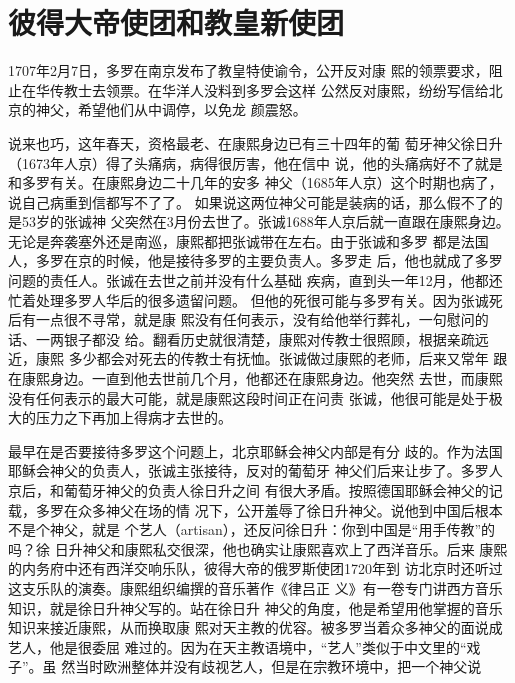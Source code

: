 \section{彼得大帝使团和教皇新使团}
\par
1707年2月7日，多罗在南京发布了教皇特使谕令，公开反对康%
熙的领票要求，阻止在华传教士去领票。在华洋人没料到多罗会这样%
公然反对康熙，纷纷写信给北京的神父，希望他们从中调停，以免龙%
颜震怒。%
\par
说来也巧，这年春天，资格最老、在康熙身边已有三十四年的葡%
萄牙神父徐日升（1673年人京）得了头痛病，病得很厉害，他在信中%
说，他的头痛病好不了就是和多罗有关。在康熙身边二十几年的安多%
神父（1685年人京）这个时期也病了，说自己病重到信都写不了了。%
如果说这两位神父可能是装病的话，那么假不了的是53岁的张诚神%
父突然在3月份去世了。张诚1688年人京后就一直跟在康熙身边。%
无论是奔袭塞外还是南巡，康熙都把张诚带在左右。由于张诚和多罗%
都是法国人，多罗在京的时候，他是接待多罗的主要负责人。多罗走%
后，他也就成了多罗问题的责任人。张诚在去世之前并没有什么基础%
疾病，直到头一年12月，他都还忙着处理多罗人华后的很多遗留问题。%
但他的死很可能与多罗有关。因为张诚死后有一点很不寻常，就是康%
熙没有任何表示，没有给他举行葬礼，一句慰问的话、一两银子都没%
给。翻看历史就很清楚，康熙对传教士很照顾，根据亲疏远近，康熙%
多少都会对死去的传教士有抚恤。张诚做过康熙的老师，后来又常年%
跟在康熙身边。一直到他去世前几个月，他都还在康熙身边。他突然%
去世，而康熙没有任何表示的最大可能，就是康熙这段时间正在问责%
张诚，他很可能是处于极大的压力之下再加上得病才去世的。%
\par
最早在是否要接待多罗这个问题上，北京耶稣会神父内部是有分%
歧的。作为法国耶稣会神父的负责人，张诚主张接待，反对的葡萄牙%
神父们后来让步了。多罗人京后，和葡萄牙神父的负责人徐日升之间%
有很大矛盾。按照德国耶稣会神父的记载，多罗在众多神父在场的情%
况下，公开羞辱了徐日升神父。说他到中国后根本不是个神父，就是%
个艺人（artisan），还反问徐日升：你到中国是“用手传教”的吗？徐%
日升神父和康熙私交很深，他也确实让康熙喜欢上了西洋音乐。后来%
康熙的内务府中还有西洋交响乐队，彼得大帝的俄罗斯使团1720年到%
访北京时还听过这支乐队的演奏。康熙组织编撰的音乐著作《律吕正%
义》有一卷专门讲西方音乐知识，就是徐日升神父写的。站在徐日升%
神父的角度，他是希望用他掌握的音乐知识来接近康熙，从而换取康%
熙对天主教的优容。被多罗当着众多神父的面说成艺人，他是很委屈%
难过的。因为在天主教语境中，“艺人”类似于中文里的“戏子”。虽%
然当时欧洲整体并没有歧视艺人，但是在宗教环境中，把一个神父说%
